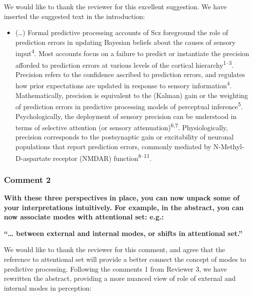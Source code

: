 \documentclass[
]{article}
\providecommand{\tightlist}{%
  \setlength{\itemsep}{0pt}\setlength{\parskip}{0pt}}
\begin{document}
We would like to thank the reviewer for this excellent suggestion. We
have inserted the suggested text in the introduction:

\begin{itemize}
\tightlist
\item
  (\ldots) Formal predictive processing accounts of Scz foreground the
  role of prediction errors in updating Bayesian beliefs about the
  causes of sensory input\textsuperscript{4}. Most accounts focus on a
  failure to predict or instantiate the precision afforded to prediction
  errors at various levels of the cortical
  hierarchy\textsuperscript{1--3}. Precision refers to the confidence
  ascribed to prediction errors, and regulates how prior expectations
  are updated in response to sensory information\textsuperscript{4}.
  Mathematically, precision is equivalent to the (Kalman) gain or the
  weighting of prediction errors in predictive processing models of
  perceptual inference\textsuperscript{5}. Psychologically, the
  deployment of sensory precision can be understood in terms of
  selective attention (or sensory attenuation)\textsuperscript{6,7}.
  Physiologically, precision corresponds to the postsynaptic gain or
  excitability of neuronal populations that report prediction errors,
  commonly mediated by N-Methyl-D-aspartate receptor (NMDAR)
  function\textsuperscript{8--11}.
\end{itemize}

\subsubsection{Comment 2}\label{comment-2}

\textbf{With these three perspectives in place, you can now unpack some
of your interpretations intuitively. For example, in the abstract, you
can now associate modes with attentional set: e.g.:}

\textbf{``\ldots{} between external and internal modes, or shifts in
attentional set.''}

We would like to thank the reviewer for this comment, and agree that the
reference to attentional set will provide a better connect the concept
of modes to predictive processing. Following the comments 1 from
Reviewer 3, we have rewritten the abstract, providing a more nuanced
view of role of external and internal modes in perception:
\end{document}

